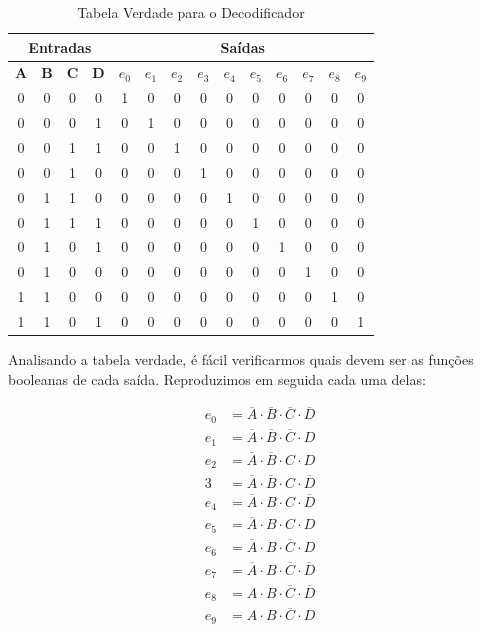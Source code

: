 \documentclass[12pt]{article}
\begin{document}
\begin{table}[H]
    \centering
    \caption{Tabela Verdade para o Decodificador}
    \begin{tabular}{|c|c|c|c||c|c|c|c|c|c|c|c|c|c|}\hline
    \multicolumn{4}{|c||}{Entradas} & \multicolumn{10}{|c|}{Saídas} \\\hline
    \textbf{A} & \textbf{B} & \textbf{C} & \textbf{D} & \textbf{$e_{0}$} & \textbf{$e_{1}$} & \textbf{$e_{2}$} & \textbf{$e_{3}$} & \textbf{$e_{4}$} & \textbf{$e_{5}$} & \textbf{$e_{6}$} & \textbf{$e_{7}$} & \textbf{$e_{8}$} & \textbf{$e_{9}$} \\\hline
    0 & 0 & 0 & 0 & 1 & 0 & 0 & 0 & 0 & 0 & 0 & 0 & 0 & 0 \\\hline
    0 & 0 & 0 & 1 & 0 & 1 & 0 & 0 & 0 & 0 & 0 & 0 & 0 & 0 \\\hline
    0 & 0 & 1 & 1 & 0 & 0 & 1 & 0 & 0 & 0 & 0 & 0 & 0 & 0 \\\hline
    0 & 0 & 1 & 0 & 0 & 0 & 0 & 1 & 0 & 0 & 0 & 0 & 0 & 0 \\\hline
    0 & 1 & 1 & 0 & 0 & 0 & 0 & 0 & 1 & 0 & 0 & 0 & 0 & 0 \\\hline
    0 & 1 & 1 & 1 & 0 & 0 & 0 & 0 & 0 & 1 & 0 & 0 & 0 & 0 \\\hline
    0 & 1 & 0 & 1 & 0 & 0 & 0 & 0 & 0 & 0 & 1 & 0 & 0 & 0 \\\hline
    0 & 1 & 0 & 0 & 0 & 0 & 0 & 0 & 0 & 0 & 0 & 1 & 0 & 0 \\\hline
    1 & 1 & 0 & 0 & 0 & 0 & 0 & 0 & 0 & 0 & 0 & 0 & 1 & 0 \\\hline
    1 & 1 & 0 & 1 & 0 & 0 & 0 & 0 & 0 & 0 & 0 & 0 & 0 & 1 \\\hline
    \end{tabular}\label{tab:tabela_and}
\end{table}

Analisando a tabela verdade, é fácil verificarmos quais devem ser as funções
booleanas de cada saída. Reproduzimos em seguida cada uma delas:

\begin{align}
e_{0} &= \overline{A} \cdot \overline{B} \cdot \overline{C} \cdot \overline{D} \\
e_{1} &= \overline{A} \cdot \overline{B} \cdot \overline{C} \cdot D \\
e_{2} &= \overline{A} \cdot \overline{B} \cdot C \cdot D \\
3 &= \overline{A} \cdot \overline{B} \cdot C \cdot \overline{D} \\
e_{4} &= \overline{A} \cdot B \cdot C \cdot \overline{D} \\
e_{5} &= \overline{A} \cdot B \cdot C \cdot D \\
e_{6} &= \overline{A} \cdot B \cdot \overline{C} \cdot D \\
e_{7} &= \overline{A} \cdot B \cdot \overline{C} \cdot \overline{D} \\
e_{8} &= A \cdot B \cdot \overline{C} \cdot \overline{D} \\
e_{9} &= A \cdot B \cdot \overline{C} \cdot D
\end{align}
\end{document}
